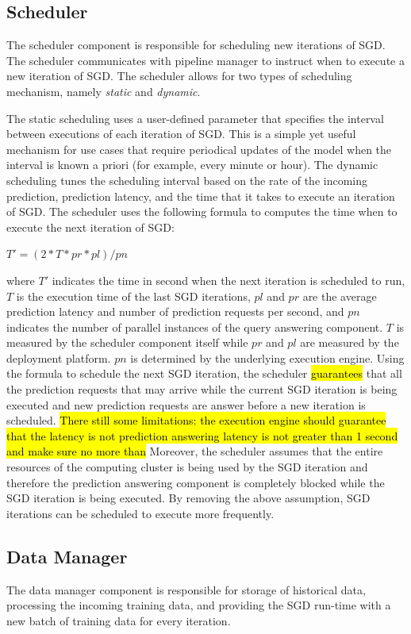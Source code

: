 \subsection{Scheduler}\label{scheduler}
The scheduler component is responsible for scheduling new iterations of SGD.
The scheduler communicates with pipeline manager to instruct when to execute a new iteration of SGD.
The scheduler allows for two types of scheduling mechanism, namely \textit{static} and \textit{dynamic}.

The static scheduling uses a user-defined parameter that specifies the interval between executions of each iteration of SGD.
This is a simple yet useful mechanism for use cases that require periodical updates of the model when the interval is known a priori (for example, every minute or hour). 
The dynamic scheduling tunes the scheduling interval based on the rate of the incoming prediction, prediction latency, and the time that it takes to execute an iteration of SGD.
The scheduler uses the following formula to computes the time when to execute the next iteration of SGD:

\begin{center}
$T' = (2 * T * pr * pl) / pn$
\end{center}
where $T'$ indicates the time in second when the next iteration is scheduled to run, $T$ is the execution time of the last SGD iterations, $pl$ and $pr$ are the average prediction latency and number of prediction requests per second, and $pn$ indicates the number of parallel instances of the query answering component.
$T$ is measured by the scheduler component itself while $pr$ and $pl$ are measured by the deployment platform.
$pn$ is determined by the underlying execution engine.
Using the formula to schedule the next SGD iteration, the scheduler \hl{guarantees} that all the prediction requests that may arrive while the current SGD iteration is being executed and new prediction requests are answer before a new iteration is scheduled.
\hl{There still some limitations: the execution engine should guarantee that the latency is not prediction answering latency is not greater than 1 second and make sure no more than }
Moreover, the scheduler assumes that the entire resources of the computing cluster is being used by the SGD iteration and therefore the prediction answering component is completely blocked while the SGD iteration is being executed.
By removing the above assumption, SGD iterations can be scheduled to execute more frequently.

\subsection{Data Manager} \label{data-manager}
The data manager component is responsible for storage of historical data, processing the incoming training data, and providing the SGD run-time with a new batch of training data for every iteration.

